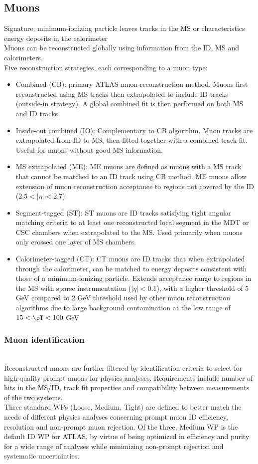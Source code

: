 \documentclass[../thesis.tex]{subfiles}
\begin{document}
\subsection{Muons}
Signature: minimum-ionizing particle leaves tracks in the MS or characteristics energy deposits in the calorimeter\\
Muons can be reconstructed globally using information from the ID, MS and calorimeters.\\
Five reconstruction strategies, each corresponding to a muon type:
\begin{itemize}
\item Combined (CB): primary ATLAS muon reconstruction method. Muons first reconstructed using MS tracks then extrapolated to include ID tracks (outside-in strategy). A global combined fit is then performed on both MS and ID tracks
\item Inside-out combined (IO): Complementary to CB algorithm. Muon tracks are extrapolated from ID to MS, then fitted together with a combined track fit. Useful for muons without good MS information.
\item MS extrapolated (ME): ME muons are defined as muons with a MS track that cannot be matched to an ID track using CB method. ME muons allow extension of muon reconstruction acceptance to regions not covered by the ID ($2.5<|\eta|<2.7$)
\item Segment-tagged (ST): ST muons are ID tracks satisfying tight angular matching criteria to at least one reconstructed local segment in the MDT or CSC chambers when extrapolated to the MS. Used primarily when muons only crossed one layer of MS chambers.
\item Calorimeter-tagged (CT): CT muons are ID tracks that when extrapolated through the calorimeter, can be matched to energy deposits consistent with those of a minimum-ionizing particle. Extends acceptance range to regions in the MS with sparse instrumentation ($|\eta|<0.1$), with a higher \pT threshold of 5 GeV compared to 2 GeV threshold used by other muon reconstruction algorithms due to large background contamination at the low \pT range of $15 < \pT < 100$ GeV
\end{itemize}
\subsubsection*{Muon identification}
\citep{reco:muon_ID}\citep{reco:muon_ID2}\\
Reconstructed muons are further filtered by identification criteria to select for high-quality prompt muons for physics analyses. Requirements include number of hits in the MS/ID, track fit properties and compatibility between measurements of the two systems.\\
Three standard WPs (Loose, Medium, Tight) are defined to better match the needs of different physics analyses concerning prompt muon ID efficiency, \pT resolution and non-prompt muon rejection. Of the three, Medium WP is the default ID WP for ATLAS, by virtue of being optimized in efficiency and purity for a wide range of analyses while minimizing non-prompt rejection and systematic uncertainties.\\
\end{document}
